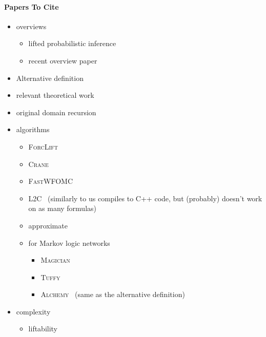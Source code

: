\documentclass{article}
\theoremstyle{definition}
\begin{document}
\paragraph{Papers To Cite}
\begin{itemize}
  \item overviews
        \begin{itemize}
          \item lifted probabilistic inference~\cite{DBLP:conf/ecai/Kersting12}
          \item recent overview paper~\cite{DBLP:conf/ijcai/Kuzelka23}
        \end{itemize}
  \item Alternative definition~\cite{DBLP:journals/cacm/GogateD16}
  \item relevant theoretical work~\cite{DBLP:conf/aaai/MalhotraS22}
  \item original domain recursion~\cite{DBLP:conf/nips/Broeck11}
  \item algorithms
        \begin{itemize}
          \item \textsc{ForcLift}~\cite{DBLP:conf/ijcai/BroeckTMDR11}
          \item \textsc{Crane}~\cite{DBLP:conf/kr/DilkasB23}
          \item \textsc{FastWFOMC}~\cite{DBLP:conf/uai/BremenK21}
          \item \textsc{L2C}~\cite{DBLP:conf/kr/KazemiP16} (similarly to us
                compiles to C++ code, but (probably) doesn't work on as many
                formulas)
          \item approximate~\cite{DBLP:conf/ijcai/BremenK20}
          \item for Markov logic networks~\cite{DBLP:journals/ml/RichardsonD06}
                \begin{itemize}
                  \item \textsc{Magician}~\cite{DBLP:conf/aaai/VenugopalSG15}
                  \item \textsc{Tuffy}~\cite{DBLP:journals/pvldb/NiuRDS11}
                  \item \textsc{Alchemy}~\cite{DBLP:journals/cacm/GogateD16}
                        (same as the alternative definition)
                \end{itemize}
        \end{itemize}
  \item complexity
        \begin{itemize}
          \item liftability~\cite{DBLP:conf/starai/JaegerB12}

\end{itemize}
\end{itemize}
\end{document}

